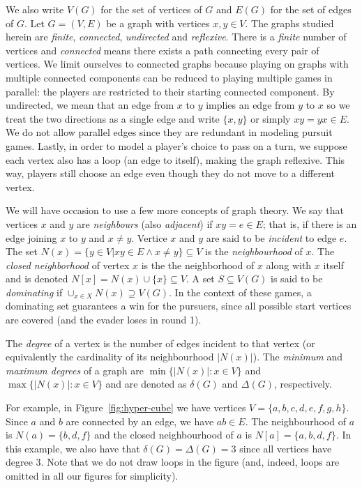We also write $V(G)$ for the set of vertices of $G$ and $E(G)$ for the set of edges of $G$.
Let $G = (V,E)$ be a graph with vertices $x,y \in V$.
The graphs studied herein are \textit{finite}, \textit{connected}, \textit{undirected} and \textit{reflexive}.
There is a \textit{finite} number of vertices and \textit{connected} means there exists a path connecting every pair of vertices.
We limit ourselves to connected graphs because playing on graphs with multiple connected components can be reduced to playing multiple games in parallel: the players are restricted to their starting connected component. By undirected, we mean that an edge from $x$ to $y$ implies an edge from $y$ to $x$ so we treat the two directions as a single edge and write $\{x,y\}$ or simply $xy = yx \in E$. We do not allow parallel edges since they are redundant in modeling pursuit games.
Lastly, in order to model a player's choice to pass on a turn, we suppose each vertex also has a loop (an edge to itself), making the graph reflexive. This way, players still choose an edge even though they do not move to a different vertex.

We will have occasion to use a few more concepts of graph theory. We say that vertices $x$ and $y$ are \textit{neighbours} (also \textit{adjacent}) if $xy = e \in E$; that is, if there is an edge joining $x$ to $y$ and $x \neq y$. Vertice $x$ and $y$ are said to be \textit{incident} to edge $e$.
The set $N(x) = \{ y \in V | xy \in E \land x \neq y\} \subseteq V$ is the \textit{neighbourhood} of $x$.
The \textit{closed neighborhood} of vertex $x$ is the the neighborhood of $x$ along with $x$ itself and is denoted $N[x] = N(x) \cup \{x\} \subseteq V$. A set $S \subseteq V(G)$ is said to be \textit{dominating} if $\cup_{x\in X} N(x) \supseteq V(G)$. In the context of these games, a dominating set guarantees a win for the pursuers, since all possible start vertices are covered (and the evader loses in round 1).

The \textit{degree} of a vertex is the number of edges incident to that vertex (or equivalently the
cardinality of its neighbourhood $\lvert N(x) \rvert$). The \textit{minimum} and \textit{maximum
degrees} of a graph are $\min\{ \lvert N(x)\rvert : x \in V\}$ and $\max \{ \lvert N(x)\rvert : x \in V\}$ and are denoted as $\delta(G)$ and $\Delta(G)$, respectively.

For example, in Figure~\ref{fig:hyper-cube} we have vertices $V = \{ a, b, c, d, e, f, g, h \}$.
Since $a$ and $b$ are connected by an edge, we have $ab \in E$.
The neighbourhood of $a$ is $N(a) = \{ b,d,f \}$ and the closed neighbourhood of $a$ is
$N[a] = \{ a, b, d, f \}$. In this example, we also have that $\delta(G) = \Delta(G) = 3$ since all vertices have degree 3. Note that we do not draw loops in the figure (and, indeed, loops are omitted in all our figures for simplicity).

